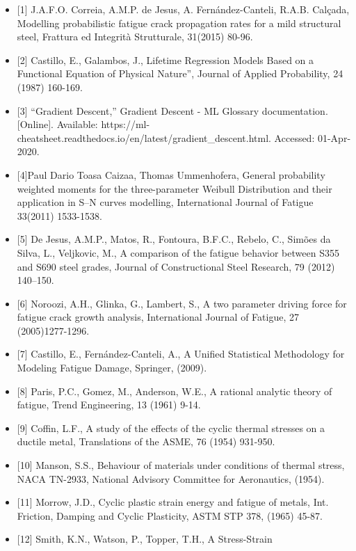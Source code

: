 \documentclass[11pt]{article}
\providecommand{\tightlist}{%
      \setlength{\itemsep}{0pt}\setlength{\parskip}{0pt}}
\begin{document}
\begin{itemize}
\tightlist
\item
  {[}1{]} J.A.F.O. Correia, A.M.P. de Jesus, A. Fernández-Canteli,
  R.A.B. Calçada, Modelling probabilistic fatigue crack propagation
  rates for a mild structural steel, Frattura ed Integrità Strutturale,
  31(2015) 80-96.
\item
  {[}2{]} Castillo, E., Galambos, J., Lifetime Regression Models Based
  on a Functional Equation of Physical Nature'', Journal of Applied
  Probability, 24 (1987) 160-169.
\item
  {[}3{]} ``Gradient Descent,'' Gradient Descent - ML Glossary
  documentation. {[}Online{]}. Available:
  https://ml-cheatsheet.readthedocs.io/en/latest/gradient\_descent.html.
  Accessed: 01-Apr-2020.
\item
  {[}4{]}Paul Dario Toasa Caizaa, Thomas Ummenhofera, General
  probability weighted moments for the three-parameter Weibull
  Distribution and their application in S--N curves modelling,
  International Journal of Fatigue 33(2011) 1533-1538.
\item
  {[}5{]} De Jesus, A.M.P., Matos, R., Fontoura, B.F.C., Rebelo, C.,
  Simões da Silva, L., Veljkovic, M., A comparison of the fatigue
  behavior between S355 and S690 steel grades, Journal of Constructional
  Steel Research, 79 (2012) 140--150.
\item
  {[}6{]} Noroozi, A.H., Glinka, G., Lambert, S., A two parameter
  driving force for fatigue crack growth analysis, International Journal
  of Fatigue, 27 (2005)1277-1296.
\item
  {[}7{]} Castillo, E., Fernández-Canteli, A., A Unified Statistical
  Methodology for Modeling Fatigue Damage, Springer, (2009).
\item
  {[}8{]} Paris, P.C., Gomez, M., Anderson, W.E., A rational analytic
  theory of fatigue, Trend Engineering, 13 (1961) 9-14.
\item
  {[}9{]} Coffin, L.F., A study of the effects of the cyclic thermal
  stresses on a ductile metal, Translations of the ASME, 76 (1954)
  931-950.
\item
  {[}10{]} Manson, S.S., Behaviour of materials under conditions of
  thermal stress, NACA TN-2933, National Advisory Committee for
  Aeronautics, (1954).
\item
  {[}11{]} Morrow, J.D., Cyclic plastic strain energy and fatigue of
  metals, Int. Friction, Damping and Cyclic Plasticity, ASTM STP 378,
  (1965) 45-87.
\item
  {[}12{]} Smith, K.N., Watson, P., Topper, T.H., A Stress-Strain

\end{itemize}
\end{document}

